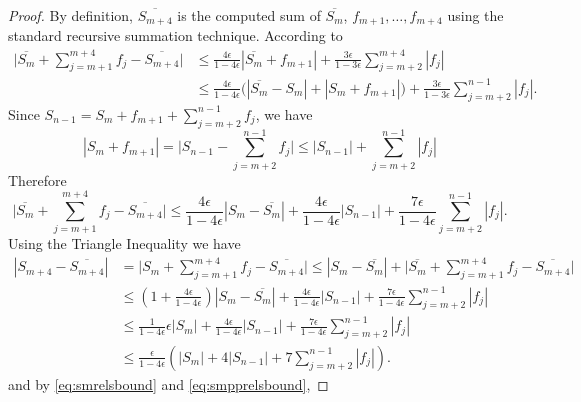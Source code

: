 \begin{proof}
      By definition, $\overline{S_{m+4}}$ is the computed sum of
      $\overline{S_m}$, $f_{m+1}, \ldots, f_{m+4}$ using the standard recursive summation technique.
      According to \cite[Equation 1.2, 2.4]{higham}
      \begin{align*}
          \bigl|\overline{S_m} + \sum_{j=m+1}^{m+4}f_j - \overline{S_{m+4}}\bigr|
          & \leq \frac{4\epsilon}{1-4\epsilon} \left|\overline{S_m} + f_{m+1}\right| + \frac{3\epsilon}{1-3\epsilon} \sum_{j=m+2}^{m+4}|f_j| \\
          & \leq \frac{4\epsilon}{1-4\epsilon} \bigl(\left|\overline{S_m} - S_m\right| + |S_m + f_{m+1}|\bigr)
              + \frac{3\epsilon}{1-3\epsilon} \sum_{j=m+2}^{n-1}|f_j|.
      \end{align*}
      Since $S_{n-1} = S_m + f_{m+1} + \sum_{j=m+2}^{n-1} f_j$, we have
      \begin{equation*}
          |S_m + f_{m+1}|
          = \bigl|S_{n-1} - \sum_{j=m+2}^{n-1}f_j\bigr|
          \leq |S_{n-1}| + \sum_{j=m+2}^{n-1} |f_j|
      \end{equation*}
      Therefore
      \begin{equation*}
          \bigl|\overline{S_m} + \sum_{j=m+1}^{m+4}f_j - \overline{S_{m+4}}\bigr|
          \leq \frac{4\epsilon}{1-4\epsilon} \left|S_m - \overline{S_m}\right|
          + \frac{4\epsilon}{1-4\epsilon} |S_{n-1}|
          + \frac{7\epsilon}{1-4\epsilon} \sum_{j=m+2}^{n-1}|f_j|.
      \end{equation*}
      Using the Triangle Inequality we have
      \begin{align*}
      \left|S_{m+4} - \overline{S_{m+4}}\right|
          & = \bigl|S_m + \sum_{j=m+1}^{m+4}f_j - \overline{S_{m+4}}\bigr|
          \leq \left|S_m - \overline{S_m} \right| + \bigl|\overline{S_m} + \sum_{j=m+1}^{m+4}f_j - \overline{S_{m+4}} \bigr| \\
          & \leq \left(1 + \frac{4\epsilon}{1-4\epsilon}\right) \left|S_m - \overline{S_m}\right| + \frac{4\epsilon}{1-4\epsilon} |S_{n-1}|
                  + \frac{7\epsilon}{1-4\epsilon} \sum_{j=m+2}^{n-1}|f_j| \\
          & \leq \frac{1}{1-4\epsilon} \epsilon |S_m| + \frac{4\epsilon}{1-4\epsilon} |S_{n-1}|
                  + \frac{7\epsilon}{1-4\epsilon} \sum_{j=m+2}^{n-1}|f_j| \\
          & \leq \frac{\epsilon}{1-4\epsilon} \left(|S_m| + 4 |S_{n-1}|
                  + 7 \sum_{j=m+2}^{n-1}|f_j|\right).
      \end{align*}
      and by \eqref{eq:smrelsbound} and \eqref{eq:smpprelsbound},

\end{proof}
